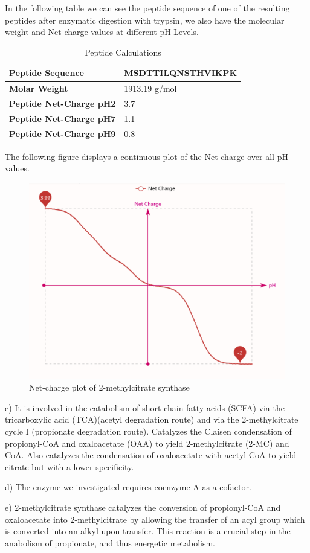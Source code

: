 \documentclass[a4paper,english,12pt,bibliography=totoc]{scrreprt}
\begin{document}
In the following table we can see the peptide sequence of one of the resulting peptides after enzymatic digestion with trypsin, we also have the molecular weight and Net-charge values at different pH Levels.
\begin{table}[H]
\centering
\begin{tabular}{|l|l|}
\hline
\textbf{Peptide Sequence} & MSDTTILQNSTHVIKPK \\
\hline
\textbf{Molar Weight} & 1913.19 g/mol \\
\hline
\textbf{Peptide Net-Charge pH2} & 3.7 \\
\hline
\textbf{Peptide Net-Charge pH7} & 1.1 \\
\hline
\textbf{Peptide Net-Charge pH9} & 0.8 \\
\hline
\end{tabular}
\caption{Peptide Calculations}
\end{table}

The following figure displays a continuous plot of the Net-charge over all pH values.
\begin{figure}[H]
    \centering
    \includegraphics[width=0.50\linewidth]{Project 2/Netcharge.png}
    \caption{Net-charge plot of 2-methylcitrate synthase }
\end{figure}

c) It is involved in the catabolism of short chain fatty acids (SCFA) via the tricarboxylic acid (TCA)(acetyl degradation route) and via the 2-methylcitrate cycle I (propionate degradation route). Catalyzes the Claisen condensation of propionyl-CoA and oxaloacetate (OAA) to yield 2-methylcitrate (2-MC) and CoA. Also catalyzes the condensation of oxaloacetate with acetyl-CoA to yield citrate but with a lower specificity.

d) The enzyme we investigated requires coenzyme A as a cofactor.

e) 2-methylcitrate synthase catalyzes the conversion of propionyl-CoA and oxaloacetate into 2-methylcitrate by allowing the transfer of an acyl group which is converted into an alkyl upon transfer. This reaction is a crucial step in the anabolism of propionate, and thus energetic metabolism.
\end{document}

